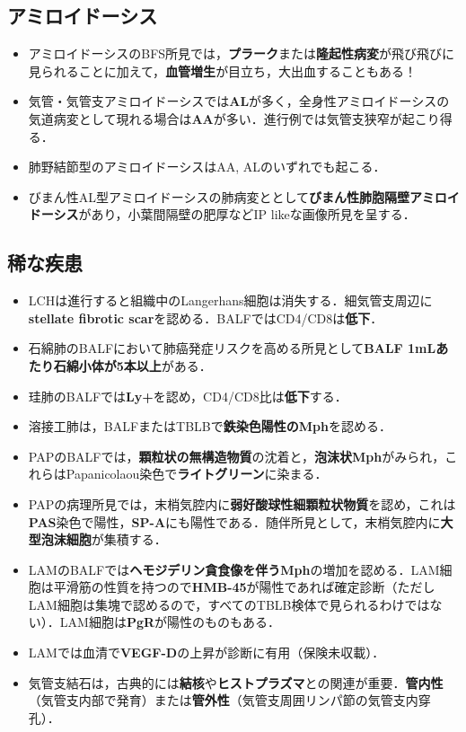 \subsection{アミロイドーシス}

\begin{itemize}

\item アミロイドーシスのBFS所見では，\textbf{プラーク}または\textbf{隆起性病変}が飛び飛びに見られることに加えて，\textbf{血管増生}が目立ち，大出血することもある！
\item 気管・気管支アミロイドーシスでは\textbf{AL}が多く，全身性アミロイドーシスの気道病変として現れる場合は\textbf{AA}が多い．進行例では気管支狭窄が起こり得る．
\item 肺野結節型のアミロイドーシスはAA, ALのいずれでも起こる．
\item びまん性AL型アミロイドーシスの肺病変ととして\textbf{びまん性肺胞隔壁アミロイドーシス}があり，小葉間隔壁の肥厚などIP likeな画像所見を呈する．
\end{itemize}

\subsection{稀な疾患}

\begin{itemize}
\item LCHは進行すると組織中のLangerhans細胞は消失する．細気管支周辺に\textbf{stellate fibrotic scar}を認める．BALFではCD4/CD8は\textbf{低下}．



\item 石綿肺のBALFにおいて肺癌発症リスクを高める所見として\textbf{BALF 1mLあたり石綿小体が5本以上}がある．
\item 珪肺のBALFでは\textbf{Ly+}を認め，CD4/CD8比は\textbf{低下}する．
\item 溶接工肺は，BALFまたはTBLBで\textbf{鉄染色陽性のMph}を認める．

\item PAPのBALFでは，\textbf{顆粒状の無構造物質}の沈着と，\textbf{泡沫状Mph}がみられ，これらはPapanicolaou染色で\textbf{ライトグリーン}に染まる．
\item PAPの病理所見では，末梢気腔内に\textbf{弱好酸球性細顆粒状物質}を認め，これは\textbf{PAS}染色で陽性，\textbf{SP-A}にも陽性である．随伴所見として，末梢気腔内に\textbf{大型泡沫細胞}が集積する．

\item LAMのBALFでは\textbf{ヘモジデリン貪食像を伴うMph}の増加を認める．LAM細胞は平滑筋の性質を持つので\textbf{HMB-45}が陽性であれば確定診断（ただしLAM細胞は集塊で認めるので，すべてのTBLB検体で見られるわけではない）．LAM細胞は\textbf{PgR}が陽性のものもある．
\item LAMでは血清で\textbf{VEGF-D}の上昇が診断に有用（保険未収載）．

\item 気管支結石は，古典的には\textbf{結核}や\textbf{ヒストプラズマ}との関連が重要．\textbf{管内性}（気管支内部で発育）または\textbf{管外性}（気管支周囲リンパ節の気管支内穿孔）．
\end{itemize}



